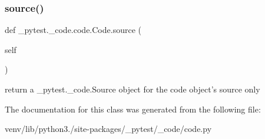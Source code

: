 \subsubsection{\texorpdfstring{source()}{source()}}
{\footnotesize\ttfamily def \+\_\+pytest.\+\_\+code.\+code.\+Code.\+source (\begin{DoxyParamCaption}\item[{}]{self }\end{DoxyParamCaption})}

\begin{DoxyVerb}return a _pytest._code.Source object for the code object's source only
\end{DoxyVerb}
 

The documentation for this class was generated from the following file\+:\begin{DoxyCompactItemize}
\item 
venv/lib/python3./site-\/packages/\+\_\+pytest/\+\_\+code/code.\+py\end{DoxyCompactItemize}
